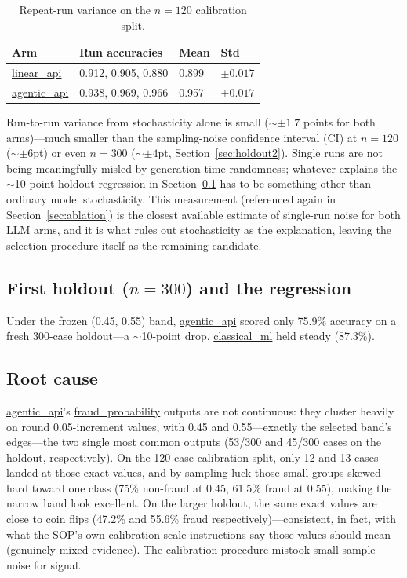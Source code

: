 \documentclass[]{ieeeaccess}
\newcommand{\code}[1]{\url{#1}}
\begin{document}
\begin{table}[H]
\centering
\caption{Repeat-run variance on the $n=120$ calibration split.}\label{tab:variance}
\footnotesize
\begin{tabularx}{\columnwidth}{@{}lYYY@{}}
\toprule
\textbf{Arm} & \textbf{Run accuracies} & \textbf{Mean} & \textbf{Std} \\
\midrule
\code{linear_api} & 0.912, 0.905, 0.880 & 0.899 & $\pm 0.017$ \\
\code{agentic_api} & 0.938, 0.969, 0.966 & 0.957 & $\pm 0.017$ \\
\bottomrule
\end{tabularx}
\end{table}

Run-to-run variance from stochasticity alone is small (${\sim}\pm 1.7$
points for both arms)---much smaller than the sampling-noise confidence
interval (CI) at $n=120$ (${\sim}\pm 6$pt) or even $n=300$
(${\sim}\pm 4$pt, Section~\ref{sec:holdout2}). Single runs are not being meaningfully
misled by generation-time randomness; whatever explains the $\sim$10-point
holdout regression in Section~\ref{sec:holdout1} has to be something other than
ordinary model stochasticity. This measurement (referenced again in
Section~\ref{sec:ablation}) is the closest available estimate of
single-run noise for both LLM arms, and it is what rules out
stochasticity as the explanation, leaving the selection procedure
itself as the remaining candidate.

\subsection{First holdout (\texorpdfstring{$n=300$}{n=300}) and the regression}\label{sec:holdout1}

Under the frozen (0.45, 0.55) band, \code{agentic_api} scored only
75.9\% accuracy on a fresh 300-case holdout---a ${\sim}$10-point drop.
\code{classical_ml} held steady (87.3\%).

\subsection{Root cause}\label{sec:rootcause}

\code{agentic_api}'s \code{fraud_probability} outputs are not
continuous: they cluster heavily on round 0.05-increment values, with
0.45 and 0.55---exactly the selected band's edges---the two single most
common outputs (53/300 and 45/300 cases on the holdout, respectively).
On the 120-case calibration split, only 12 and 13 cases landed at those
exact values, and by sampling luck those small groups skewed hard toward
one class (75\% non-fraud at 0.45, 61.5\% fraud at 0.55), making the
narrow band look excellent. On the larger holdout, the same exact values
are close to coin flips (47.2\% and 55.6\% fraud respectively)---consistent, in fact, with what the SOP's own calibration-scale
instructions say those values should mean (genuinely mixed evidence). The
calibration procedure mistook small-sample noise for signal.
\end{document}
